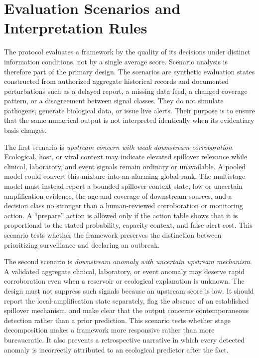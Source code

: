 \documentclass[conference]{IEEEtran}
\begin{document}
\section{Evaluation Scenarios and Interpretation Rules}

The protocol evaluates a framework by the quality of its decisions under distinct information conditions, not by a single average score. Scenario analysis is therefore part of the primary design. The scenarios are synthetic evaluation states constructed from authorized aggregate historical records and documented perturbations such as a delayed report, a missing data feed, a changed coverage pattern, or a disagreement between signal classes. They do not simulate pathogens, generate biological data, or issue live alerts. Their purpose is to ensure that the same numerical output is not interpreted identically when its evidentiary basis changes.

The first scenario is \emph{upstream concern with weak downstream corroboration}. Ecological, host, or viral context may indicate elevated spillover relevance while clinical, laboratory, and event signals remain ordinary or unavailable. A pooled model could convert this mixture into an alarming global rank. The multistage model must instead report a bounded spillover-context state, low or uncertain amplification evidence, the age and coverage of downstream sources, and a decision class no stronger than a human-reviewed corroboration or monitoring action. A ``prepare'' action is allowed only if the action table shows that it is proportional to the stated probability, capacity context, and false-alert cost. This scenario tests whether the framework preserves the distinction between prioritizing surveillance and declaring an outbreak.

The second scenario is \emph{downstream anomaly with uncertain upstream mechanism}. A validated aggregate clinical, laboratory, or event anomaly may deserve rapid corroboration even when a reservoir or ecological explanation is unknown. The design must not suppress such signals because an upstream score is low. It should report the local-amplification state separately, flag the absence of an established spillover mechanism, and make clear that the output concerns contemporaneous detection rather than a prior prediction. This scenario tests whether stage decomposition makes a framework more responsive rather than more bureaucratic. It also prevents a retrospective narrative in which every detected anomaly is incorrectly attributed to an ecological predictor after the fact.
\end{document}

